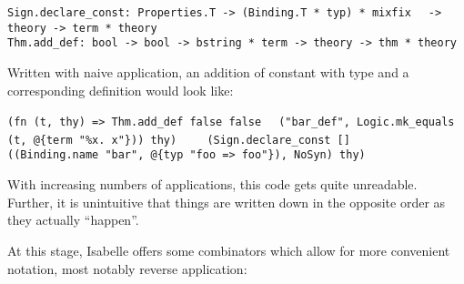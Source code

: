 \begin{isabellebody}
\begin{isamarkuptext}
  \smallskip\begin{mldecls}
  \verb|Sign.declare_const: Properties.T -> (Binding.T * typ) * mixfix|\isasep\isanewline%
\verb|  -> theory -> term * theory| \\
  \verb|Thm.add_def: bool -> bool -> bstring * term -> theory -> thm * theory|
  \end{mldecls}

  \noindent Written with naive application, an addition of constant
   with type  and
  a corresponding definition  would look like:

  \smallskip\begin{mldecls}
  \verb|(fn (t, thy) => Thm.add_def false false|\isasep\isanewline%
\verb|  ("bar_def", Logic.mk_equals (t, @{term "%x. x"})) thy)|\isasep\isanewline%
\verb|    (Sign.declare_const []|\isasep\isanewline%
\verb|      ((Binding.name "bar", @{typ "foo => foo"}), NoSyn) thy)|
  \end{mldecls}

  \noindent With increasing numbers of applications, this code gets quite
  unreadable.  Further, it is unintuitive that things are
  written down in the opposite order as they actually ``happen''.%
\end{isamarkuptext}%
\isamarkuptrue%
%
\begin{isamarkuptext}%
\noindent At this stage, Isabelle offers some combinators which allow
  for more convenient notation, most notably reverse application:


\end{isamarkuptext}
\end{isabellebody}
